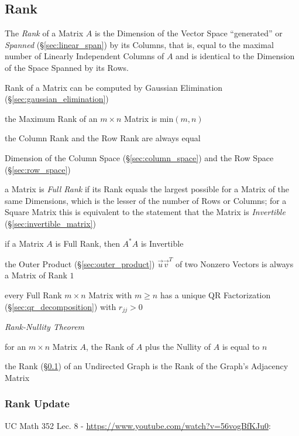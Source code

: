\subsection{Rank}\label{sec:rank}

The \emph{Rank} of a Matrix $A$ is the Dimension of the Vector Space
``generated'' or \emph{Spanned} (\S\ref{sec:linear_span}) by its Columns, that
is, equal to the maximal number of Linearly Independent Columns of $A$ and is
identical to the Dimension of the Space Spanned by its Rows.

\fist Rank of a Matrix can be computed by Gaussian Elimination
(\S\ref{sec:gaussian_elimination})

the Maximum Rank of an $m \times n$ Matrix is $\mathrm{min}(m,n)$

the Column Rank and the Row Rank are always equal

Dimension of the Column Space (\S\ref{sec:column_space}) and the Row Space
(\S\ref{sec:row_space})

a Matrix is \emph{Full Rank} if its Rank equals the largest possible for a
Matrix of the same Dimensions, which is the lesser of the number of Rows or
Columns; for a Square Matrix this is equivalent to the statement that the
Matrix is \emph{Invertible} (\S\ref{sec:invertible_matrix})

if a Matrix $A$ is Full Rank, then $A^*A$ is Invertible

the Outer Product (\S\ref{sec:outer_product}) $\vec{u}\vec{v}^T$ of two Nonzero
Vectors is always a Matrix of Rank $1$

every Full Rank $m \times n$ Matrix with $m \geq n$ has a unique QR
Factorization (\S\ref{sec:qr_decomposition}) with $r_{jj} > 0$

\emph{Rank-Nullity Theorem}

for an $m \times n$ Matrix $A$, the Rank of $A$ plus the Nullity of $A$ is
equal to $n$

\fist the Rank (\S\ref{sec:rank}) of an Undirected Graph is the Rank of the
Graph's Adjacency Matrix



\subsubsection{Rank Update}\label{sec:rank_update}

UC Math 352 Lec. 8 - \url{https://www.youtube.com/watch?v=56vogBfKJu0}:

